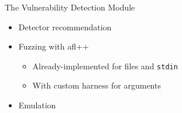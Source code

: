 \begin{frame}{The Vulnerability Detection Module}
    \begin{figure}
        \centering
        \hspace{1em}
        \hspace{1em}
        \hspace{1em}
        \hspace{1em}
    \end{figure}
    \vfill
    \pause

    \begin{itemize}
        \item Detector recommendation\pause
        \item Fuzzing with afl++
              \begin{itemize}
                  \item Already-implemented for files and \texttt{stdin}
                  \item With custom harness for arguments \pause
              \end{itemize}
        \item Emulation
    \end{itemize}

\end{frame}

